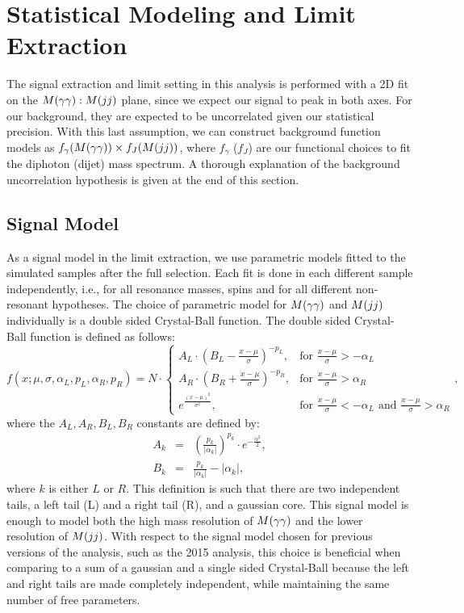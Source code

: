 \section{Statistical Modeling and Limit Extraction}
\label{sec:modeling}

The signal extraction and limit setting in this analysis is performed with a 2D fit on the $M(\gamma\gamma):M(jj)$ plane, since we expect our signal to peak in both axes. For our background, they are expected to be uncorrelated given our statistical precision. With this last assumption, we can construct background function models as $f_{\gamma}(M(\gamma\gamma))\times f_{J}(M(jj))$, where $f_{\gamma}$ ($f_{J}$) are our functional choices to fit the diphoton (dijet) mass spectrum. A thorough explanation of the background uncorrelation hypothesis is given at the end of this section.


\subsection{Signal Model}

As a signal model in the limit extraction, we use parametric models fitted to the simulated samples after the full selection. 
Each fit is done in each different sample independently, i.e., for all resonance masses, spins and for all different non-resonant hypotheses. 
The choice of parametric model for $M(\gamma\gamma)$ and $M(jj)$ individually is a double sided Crystal-Ball function. 
The double sided Crystal-Ball function is defined as follows:
\begin{equation}
f(x;\mu, \sigma, \alpha_{L}, p_{L}, \alpha_{R}, p_{R}) = N \cdot 
\begin{cases} 
A_{L} \cdot \left( B_{L} - \frac{x - \mu}{\sigma} \right)^{-p_{L}}, & \mbox{for } \frac{x - \mu}{\sigma} > - \alpha_{L} \\
A_{R} \cdot \left( B_{R} + \frac{x - \mu}{\sigma} \right)^{-p_{R}}, & \mbox{for } \frac{x - \mu}{\sigma} > \alpha_{R} \\
e^{  \frac{\left( x - \mu \right)^{2}}{\sigma^{2}} }, & \mbox{for } \frac{x - \mu}{\sigma} < - \alpha_{L}  \mbox{ and } \frac{x - \mu}{\sigma} > \alpha_{R}
 \end{cases},
 \end{equation}
 where the $A_{L}, A_{R}, B_{L}, B_{R}$ constants are defined by:
 \begin{eqnarray}
 A_{k} &=& \left( \frac{p_{k}}{\left| \alpha_{k} \right|} \right)^{p_{k}} \cdot e^{-\frac{\alpha^{2}}{2}}, \\
 B_{k} &=& \frac{p_{k}}{\left| \alpha_{k} \right|} - \left| \alpha_{k} \right|,
 \end{eqnarray}
 where $k$ is either $L$ or $R$. This definition is such that there are two independent tails, a left tail (L) and a right tail (R), and a gaussian core.  
This signal model is enough to model both the high mass resolution of $M(\gamma\gamma)$ and the lower resolution of $M(jj)$. 
With respect to the signal model chosen for previous versions of the analysis, such as the 2015 analysis, this choice is beneficial when comparing to a sum of a gaussian and a single sided Crystal-Ball because the left and right tails are made completely independent, while maintaining the same number of free parameters.

